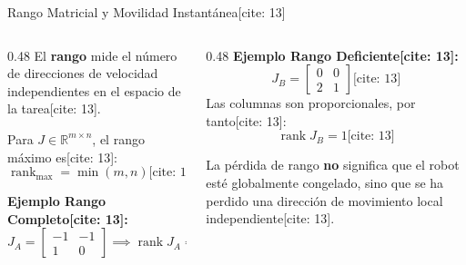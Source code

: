 \documentclass[aspectratio=169, xcolor={table,xcdraw}]{beamer}
\begin{document}
\begin{frame}{Rango Matricial y Movilidad Instantánea[cite: 13]}
    \begin{columns}[T]
        \begin{column}{0.48\textwidth}
            El \textbf{rango} mide el número de direcciones de velocidad independientes en el espacio de la tarea[cite: 13].
            
            Para $J \in \mathbb{R}^{m \times n}$, el rango máximo es[cite: 13]:
            \begin{equation*}
                \operatorname{rank}_{\max} = \min(m,n) \text{[cite: 13]}
            \end{equation*}
            
            \textbf{Ejemplo Rango Completo[cite: 13]:}
            \begin{equation*}
                J_A = \begin{bmatrix} -1 & -1 \\ 1 & 0 \end{bmatrix} \implies \operatorname{rank} J_A = 2
            \end{equation*}
        \end{column}
        \begin{column}{0.48\textwidth}
            \textbf{Ejemplo Rango Deficiente[cite: 13]:}
            \begin{equation*}
                J_B = \begin{bmatrix} 0 & 0 \\ 2 & 1 \end{bmatrix} \text{[cite: 13]}
            \end{equation*}
            Las columnas son proporcionales, por tanto[cite: 13]:
            \begin{equation*}
                \operatorname{rank} J_B = 1 \text{[cite: 13]}
            \end{equation*}
            
            \begin{tcolorbox}[colback=yellow!10, colframe=orange, title=Significado Físico, boxsep=0mm, top=1mm, bottom=1mm, left=1mm, right=1mm]
                \small La pérdida de rango \textbf{no} significa que el robot esté globalmente congelado, sino que se ha perdido una dirección de movimiento local independiente[cite: 13].
            \end{tcolorbox}
        \end{column}
    \end{columns}
\end{frame}
\end{document}
